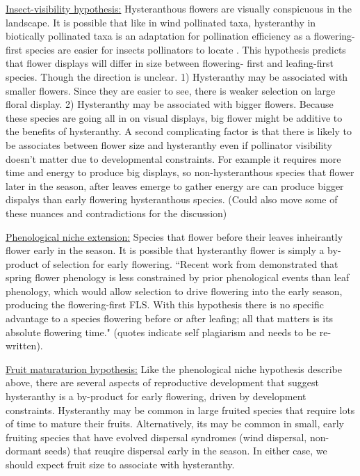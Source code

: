 \documentclass{article}[11pt]
\begin{document}
\underline{Insect-visibility hypothesis:} Hysteranthous flowers are visually conspicuous in the landscape. It is possible that like in wind pollinated taxa, hysteranthy in biotically pollinated taxa is an adaptation for pollination efficiency as a flowering-first species are easier for insects pollinators to locate \citep{}. This hypothesis predicts that flower displays will differ in size between flowering- first and leafing-first species. Though the direction is unclear. 1) Hysteranthy may be associated with smaller flowers. Since they are easier to see, there is weaker selection on large floral display. 2) Hysteranthy may be associated with bigger flowers. Because these species are going all in on visual displays, big flower might be additive to the benefits of hysteranthy. A second complicating factor is that there is likely to be associates between flower size and hysteranthy even if pollinator visibility doesn't matter due to developmental constraints. For example it requires more time and energy to produce big displays, so non-hysteranthous species that flower later in the season, after leaves emerge to gather energy are can produce bigger dispalys than early flowering hysteranthous species. (Could also move some of these nuances and contradictions for the discussion)

\underline{Phenological niche extension:} Species that flower before their leaves inheirantly flower early in the season. It is possible that hysteranthy flower is simply a by-product of selection for early flowering.
``Recent work from \citet{Savage2019} demonstrated that spring flower phenology is less constrained by prior phenological events than leaf phenology, which would allow selection to drive flowering into the early season, producing the flowering-first FLS. With this hypothesis there is no specific advantage to a species flowering before or after leafing; all that matters is its absolute flowering time." (quotes indicate self plagiarism and needs to be re-written).

\underline{Fruit maturaturion hypothesis:} Like the phenological niche hypothesis describe above, there are several aspects of reproductive development that suggest hysteranthy is a by-product for early flowering, driven by development constraints. Hysteranthy may be common in large fruited species that require lots of time to mature their fruits. Alternatively, its may be common in small, early fruiting species that have evolved dispersal syndromes (wind dispersal, non-dormant seeds) that reuqire dispersal early in the season. In either case, we  should expect fruit size to associate with hysteranthy.
\end{document}
